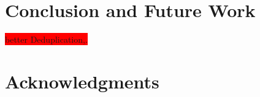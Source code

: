 \documentclass{sig-alternate}
\newcommand{\todo}[1]{\colorbox{red}{#1}}
\begin{document}

\section{Conclusion and Future Work}
\label{sec:conclusions}
\todo{better Deduplication,.}

\section{Acknowledgments}
\label{sec:ack}

\nocite{*}


\balancecolumns
\end{document}
